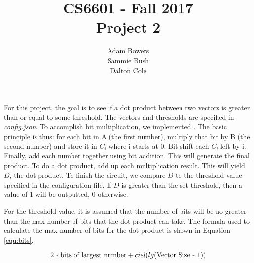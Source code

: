 \documentclass[times]{article}
\begin{document}
	\title{CS6601  - Fall 2017 \\ Project 2}
	\author{Adam Bowers \\ Sammie Bush \\ Dalton Cole}
	\date{}
	\maketitle
	
	For this project, the goal is to see if a dot product between two vectors is greater than or equal to some threshold. The vectors and thresholds are specified in \textit{config.json}. To accomplish bit multiplication, we implemented \cite{ref:mult}. The basic principle is thus: for each bit in A (the first number), multiply that bit by B (the second number) and store it in $C_i$ where i starts at 0. Bit shift each $C_i$ left by i. Finally, add each number together using bit addition. This will generate the final product. To do a dot product, add up each multiplication result. This will yield $D$, the dot product. To finish the circuit, we compare $D$ to the threshold value specified in the configuration file. If $D$ is greater than the set threshold, then a value of 1 will be outputted, 0 otherwise.

	For the threshold value, it is assumed that the number of bits will be no greater than the max number of bits that the dot product can take. The formula used to calculate the max number of bits for the dot product is shown in Equation \ref{equ:bits}.

	\begin{equation}
		\label{equ:bits}
		2 * \textnormal{bits of largest number} + ciel(lg(\textnormal{Vector Size - 1}))
	\end{equation}


	\medskip
	
	
\end{document}
